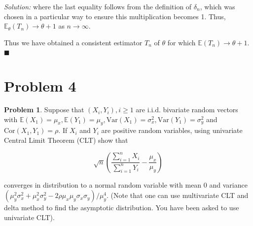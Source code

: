 \documentclass[12pt]{article}
\newcommand{\E}{\mathbb{E}}
\newcommand{\Var}{\text{Var}}
\newcommand{\corr}{\mathrm{Cor}}
\theoremstyle{definition}
\newtheorem*{prb}{Problem}
\newenvironment{problem}{\begin{tcolorbox}[colback=blue!5!white,colframe=blue!75!black, parbox = true] \begin{prb}  }{\end{prb}\end{tcolorbox} }
\newenvironment{answer}{\textit{Solution: }\quad }{ \hfill $\blacksquare$}
\numberwithin{equation}{section}
\begin{document}
\begin{answer}
where the last equality follows from the definition of $\delta_n$, which was chosen in a particular way to ensure this multiplication becomes 1. Thus, $\E_{\theta}(T_n) \rightarrow \theta+1$ as $n \rightarrow \infty$. 


Thus we have obtained a consistent estimator $T_n$ of $\theta$ for which $\E(T_n) \rightarrow\theta + 1$.
\end{answer}

\pagebreak
\section{Problem 4}

\begin{problem}
Suppose that $(X_i,Y_i),i\geq 1$ are i.i.d. bivariate random vectors with $\E(X_1)=\mu_x,\E(Y_1)=\mu_y,\Var(X_1)=\sigma_x^2,\Var(Y_1)=\sigma_y^2$ and $\corr(X_1,Y_1)=\rho$. If $X_i$ and $Y_i$ are positive random variables, using univariate Central Limit Theorem (CLT) show that

$$\sqrt{n}\left( \dfrac{\sum_{i=1}^n X_i}{\sum_{i=1}^n Y_i} - \dfrac{\mu_x}{\mu_y} \right)$$

converges in distribution to a normal random variable with mean $0$ and variance 
$\left( \mu_y^2\sigma_x^2 + \mu_x^2\sigma_y^2 - 2\rho\mu_x\mu_y\sigma_x\sigma_y \right)/\mu_y^4$. 
(Note that one can use multivariate CLT and delta method to find the asymptotic distribution. You have been asked to use univariate CLT).
\end{problem}
\end{document}
